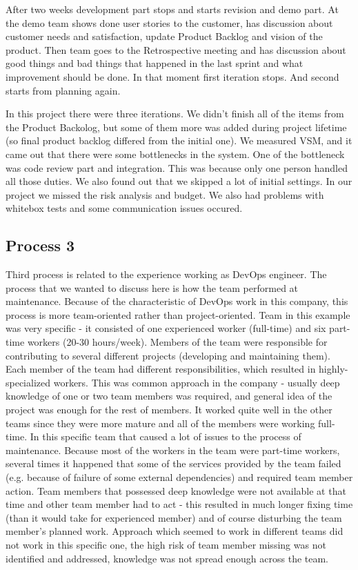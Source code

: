 After two weeks development part stops and starts revision and demo part. At the demo team shows done user stories to the customer, has discussion about customer needs and satisfaction, update Product Backlog and vision of the product. Then team goes to the Retrospective meeting and has discussion about good things and bad things that happened in the last sprint and what improvement should be done. In that moment first iteration stops. And second starts from planning again.

In this project there were three iterations. We didn't finish all of the items from the Product Backolog, but some of them more was added during project lifetime (so final product backlog differed from the initial one). We measured VSM, and it came out that there were some bottlenecks in the system. One of the bottleneck was code review part and integration. This was because only one person handled all those duties. We also found out that we skipped a lot of initial settings. In our project we missed the risk analysis and budget. We also had problems with whitebox tests and some communication issues occured.

\subsection*{Process 3}

Third process is related to the experience working as DevOps engineer. The process that we wanted to discuss here is how the team performed at maintenance. Because of the characteristic of DevOps work in this company, this process is more team-oriented rather than project-oriented. Team in this example was very specific - it consisted of one experienced worker (full-time) and six part-time workers (20-30 hours/week). Members of the team were responsible for contributing to several different projects (developing and maintaining them). Each member of the team had different responsibilities, which resulted in highly-specialized workers. This was common approach in the company - usually deep knowledge of one or two team members was required, and general idea of the project was enough for the rest of members. It worked quite well in the other teams since they were more mature and all of the members were working full-time. In this specific team that caused a lot of issues to the process of maintenance. Because most of the workers in the team were part-time workers, several times it happened that some of the services provided by the team failed (e.g. because of failure of some external dependencies) and required team member action. Team members that possessed deep knowledge were not available at that time and other team member had to act - this resulted in much longer fixing time (than it would take for experienced member) and of course disturbing the team member's planned work. Approach which seemed to work in different teams did not work in this specific one, the high risk of team member missing was not identified and addressed, knowledge was not spread enough across the team.
